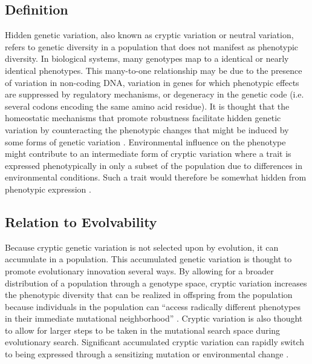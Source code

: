 \subsection{Definition}
Hidden genetic variation, also known as cryptic variation or neutral variation, refers to genetic diversity in a population that does not manifest as phenotypic diversity.
In biological systems, many genotypes map to a identical or nearly identical phenotypes.
This many-to-one relationship may be due to the presence of variation in non-coding DNA, variation in genes for which phenotypic effects are suppressed by regulatory mechanisms, or degeneracy in the genetic code (i.e. several codons encoding the same amino acid residue).
It is thought that the homeostatic mechanisms that promote robustness facilitate hidden genetic variation by counteracting the phenotypic changes that might be induced by some forms of genetic variation \cite{Moczek2011TheInnovation}.
Environmental influence on the phenotype might contribute to an intermediate form of cryptic variation where a trait is expressed phenotypically in only a subset of the population due to differences in environmental conditions.
Such a trait would therefore be somewhat hidden from phenotypic expression \cite{Moczek2011TheInnovation}.

\subsection{Relation to Evolvability}
Because cryptic genetic variation is not selected upon by evolution, it can accumulate in a population.
This accumulated genetic variation is thought to promote evolutionary innovation \cite{Wilder2015ReconcilingEvolvability} several ways.
By allowing for a broader distribution of a population through a genotype space, cryptic variation increases the phenotypic diversity that can be realized in offspring from the population because individuals in the population can ``access radically different phenotypes in their immediate mutational neighborhood'' \cite{Wilder2015ReconcilingEvolvability}.
Cryptic variation is also thought to allow for larger steps to be taken in the mutational search space during evolutionary search.
Significant accumulated cryptic variation can rapidly switch to being expressed through a sensitizing mutation or environmental change \cite{Moczek2011TheInnovation}.


